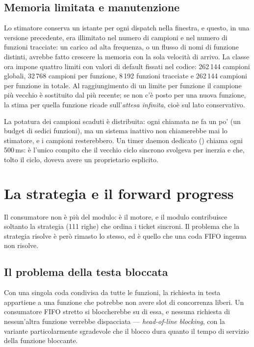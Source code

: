 \subsection{Memoria limitata e manutenzione}

Lo stimatore conserva un istante per ogni dispatch nella finestra, e questo,
in una versione precedente, era illimitato nel numero di campioni e nel numero
di funzioni tracciate: un carico ad alta frequenza, o un flusso di nomi di
funzione distinti, avrebbe fatto crescere la memoria con la sola velocit\`a di
arrivo. La classe ora impone quattro limiti con valori di default fissati nel
codice: 262\,144 campioni globali, 32\,768 campioni per funzione, 8\,192 funzioni
tracciate e 262\,144 campioni per funzione in totale. Al raggiungimento di un
limite per funzione il campione pi\`u vecchio \`e sostituito dal pi\`u recente; se
non c'\`e posto per una nuova funzione, la stima per quella funzione ricade
sull'\emph{attesa infinita}, cio\`e sul lato conservativo.

La potatura dei campioni scaduti \`e distribuita: ogni chiamata ne fa un po' (un
budget di sedici funzioni), ma un sistema inattivo non chiamerebbe mai lo
stimatore, e i campioni resterebbero. Un timer daemon dedicato
() chiama  ogni
500\,ms: \`e l'unico compito che il vecchio ciclo sincrono svolgeva per
inerzia e che, tolto il ciclo, doveva avere un proprietario esplicito.

\section{La strategia  e il forward progress}
\label{sec:10-strategia}

Il consumatore non \`e pi\`u del modulo: \`e il motore, e il modulo contribuisce
soltanto la strategia (111 righe) che ordina i ticket sincroni. Il problema
che la strategia risolve \`e per\`o rimasto lo stesso, ed \`e quello che una coda
FIFO ingenua non risolve.

\subsection{Il problema della testa bloccata}

Con una singola coda condivisa da tutte le funzioni, la richiesta in testa
appartiene a una funzione che potrebbe non avere slot di concorrenza liberi. Un
consumatore FIFO stretto si bloccherebbe su di essa, e nessuna richiesta di
nessun'altra funzione verrebbe dispacciata --- \emph{head-of-line blocking}, con
la variante particolarmente sgradevole che il blocco dura quanto il tempo di
servizio della funzione bloccante.


